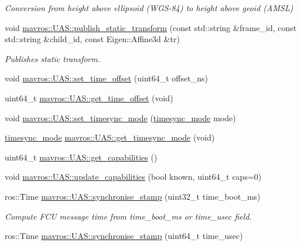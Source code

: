 \begin{DoxyCompactItemize}
\begin{DoxyCompactList}\small\item\em Conversion from height above ellipsoid (W\+G\+S-\/84) to height above geoid (A\+M\+SL) \end{DoxyCompactList}\item 
void \mbox{\hyperlink{group__nodelib_gab34a88daf20e38cb4ed8e26c6898704a}{mavros\+::\+U\+A\+S\+::publish\+\_\+static\+\_\+transform}} (const std\+::string \&frame\+\_\+id, const std\+::string \&child\+\_\+id, const Eigen\+::\+Affine3d \&tr)
\begin{DoxyCompactList}\small\item\em Publishes static transform. \end{DoxyCompactList}\item 
void \mbox{\hyperlink{group__nodelib_ga50b971d58f9196c4201a1a3213428e71}{mavros\+::\+U\+A\+S\+::set\+\_\+time\+\_\+offset}} (uint64\+\_\+t offset\+\_\+ns)
\item 
uint64\+\_\+t \mbox{\hyperlink{group__nodelib_ga1f582ffa4b83892e65bf2abff10e86e1}{mavros\+::\+U\+A\+S\+::get\+\_\+time\+\_\+offset}} (void)
\item 
void \mbox{\hyperlink{group__nodelib_gafd550e12066507238346b5cf4814d688}{mavros\+::\+U\+A\+S\+::set\+\_\+timesync\+\_\+mode}} (\mbox{\hyperlink{group__mavutils_gac7f53712a7627f397d0eb145c2a16cf7}{timesync\+\_\+mode}} mode)
\item 
\mbox{\hyperlink{group__mavutils_gac7f53712a7627f397d0eb145c2a16cf7}{timesync\+\_\+mode}} \mbox{\hyperlink{group__nodelib_ga2284947568b4a2205a500d8c494ae7fa}{mavros\+::\+U\+A\+S\+::get\+\_\+timesync\+\_\+mode}} (void)
\item 
uint64\+\_\+t \mbox{\hyperlink{group__nodelib_ga11f231ebf1dcdf015466ecec477c5795}{mavros\+::\+U\+A\+S\+::get\+\_\+capabilities}} ()
\item 
void \mbox{\hyperlink{group__nodelib_ga6e1867e65586363b66cc274a970c0660}{mavros\+::\+U\+A\+S\+::update\+\_\+capabilities}} (bool known, uint64\+\_\+t caps=0)
\item 
ros\+::\+Time \mbox{\hyperlink{group__nodelib_ga0fefb6563eb4fdd64b7b3ee2898f786e}{mavros\+::\+U\+A\+S\+::synchronise\+\_\+stamp}} (uint32\+\_\+t time\+\_\+boot\+\_\+ms)
\begin{DoxyCompactList}\small\item\em Compute F\+CU message time from time\+\_\+boot\+\_\+ms or time\+\_\+usec field. \end{DoxyCompactList}\item 
ros\+::\+Time \mbox{\hyperlink{group__nodelib_ga12c99ff6a2e51345ad813086f79bb2c1}{mavros\+::\+U\+A\+S\+::synchronise\+\_\+stamp}} (uint64\+\_\+t time\+\_\+usec)

\end{DoxyCompactItemize}
